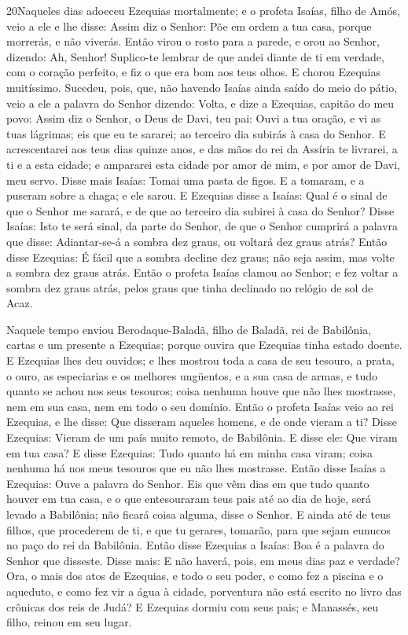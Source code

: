 \medskip

\lettrine{20} Naqueles dias adoeceu Ezequias mortalmente; e o
profeta Isaías, filho de Amós, veio a ele e lhe disse: Assim diz o
Senhor: Põe em ordem a tua casa, porque morrerás, e não viverás.
Então virou o rosto para a parede, e orou ao Senhor, dizendo:
Ah, Senhor! Suplico-te lembrar de que andei diante de ti em
verdade, com o coração perfeito, e fiz o que era bom aos teus olhos.
E chorou Ezequias muitíssimo. Sucedeu, pois, que, não havendo
Isaías ainda saído do meio do pátio, veio a ele a palavra do Senhor
dizendo: Volta, e dize a Ezequias, capitão do meu povo: Assim
diz o Senhor, o Deus de Davi, teu pai: Ouvi a tua oração, e vi as
tuas lágrimas; eis que eu te sararei; ao terceiro dia subirás à casa
do Senhor. E acrescentarei aos teus dias quinze anos, e das mãos
do rei da Assíria te livrarei, a ti e a esta cidade; e ampararei
esta cidade por amor de mim, e por amor de Davi, meu servo.
Disse mais Isaías: Tomai uma pasta de figos. E a tomaram, e a
puseram sobre a chaga; e ele sarou. E Ezequias disse a Isaías:
Qual é o sinal de que o Senhor me sarará, e de que ao terceiro dia
subirei à casa do Senhor? Disse Isaías: Isto te será sinal, da
parte do Senhor, de que o Senhor cumprirá a palavra que disse:
Adiantar-se-á a sombra dez graus, ou voltará dez graus atrás?
Então disse Ezequias: É fácil que a sombra decline dez graus;
não seja assim, mas volte a sombra dez graus atrás. Então o
profeta Isaías clamou ao Senhor; e fez voltar a sombra dez graus
atrás, pelos graus que tinha declinado no relógio de sol de Acaz.

Naquele tempo enviou Berodaque-Baladã, filho de Baladã, rei de
Babilônia, cartas e um presente a Ezequias; porque ouvira que
Ezequias tinha estado doente. E Ezequias lhes deu ouvidos; e
lhes mostrou toda a casa de seu tesouro, a prata, o ouro, as
especiarias e os melhores ungüentos, e a sua casa de armas, e tudo
quanto se achou nos seus tesouros; coisa nenhuma houve que não lhes
mostrasse, nem em sua casa, nem em todo o seu domínio. Então
o profeta Isaías veio ao rei Ezequias, e lhe disse: Que disseram
aqueles homens, e de onde vieram a ti? Disse Ezequias: Vieram de um
país muito remoto, de Babilônia. E disse ele: Que viram em
tua casa? E disse Ezequias: Tudo quanto há em minha casa viram;
coisa nenhuma há nos meus tesouros que eu não lhes mostrasse.
Então disse Isaías a Ezequias: Ouve a palavra do Senhor.
Eis que vêm dias em que tudo quanto houver em tua casa, e o
que entesouraram teus pais até ao dia de hoje, será levado a
Babilônia; não ficará coisa alguma, disse o Senhor. E ainda
até de teus filhos, que procederem de ti, e que tu gerares, tomarão,
para que sejam eunucos no paço do rei da Babilônia. Então
disse Ezequias a Isaías: Boa é a palavra do Senhor que disseste.
Disse mais: E não haverá, pois, em meus dias paz e verdade?
Ora, o mais dos atos de Ezequias, e todo o seu poder, e como
fez a piscina e o aqueduto, e como fez vir a água à cidade,
porventura não está escrito no livro das crônicas dos reis de Judá?
E Ezequias dormiu com seus pais; e Manassés, seu filho,
reinou em seu lugar.

